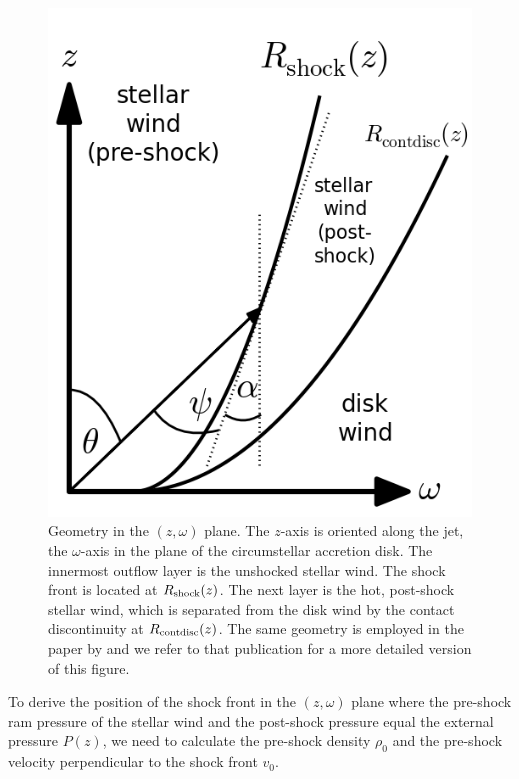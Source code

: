 \documentclass{emulateapj}
\begin{document}
\begin{figure}[h!]
\begin{center}
\includegraphics[width=0.35\columnwidth]{figures/sketch/sketch.png}
\caption{\label{fig:sketch}
Geometry in the $(z, \omega)$ plane. The $z$-axis is oriented along the jet, the $\omega$-axis in the plane of the circumstellar accretion disk. The innermost outflow layer is the unshocked stellar wind. The shock front is located at $R_{\rm{shock}}(z)$. The next layer is the hot, post-shock stellar wind, which is separated from the disk wind by the contact discontinuity at $R_{\rm{contdisc}}(z)$. The same geometry is employed in the paper by \citet{2012MNRAS.422.2282K} and we refer to that publication for a more detailed version of this figure.}
\end{center}
\end{figure}

To derive the position of the shock front in the $(z, \omega)$ plane where the pre-shock ram pressure of the stellar wind and the post-shock pressure equal the external pressure $P(z)$, we need to calculate the pre-shock density $\rho_0$ and the pre-shock velocity perpendicular to the shock front $v_0$.
\end{document}
